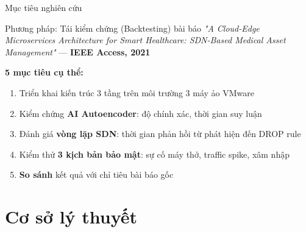\documentclass[aspectratio=169, 12pt]{beamer}
\begin{document}
\begin{frame}{Mục tiêu nghiên cứu}

\begin{block}{Phương pháp: Tái kiểm chứng (Backtesting) bài báo}
\textit{"A Cloud-Edge Microservices Architecture for Smart Healthcare: SDN-Based Medical Asset Management"} — \textbf{IEEE Access, 2021}
\end{block}

\vspace{0.3cm}
\textbf{5 mục tiêu cụ thể:}
\begin{enumerate}
  \item Triển khai kiến trúc 3 tầng trên môi trường 3 máy ảo VMware
  \item Kiểm chứng \textbf{AI Autoencoder}: độ chính xác, thời gian suy luận
  \item Đánh giá \textbf{vòng lặp SDN}: thời gian phản hồi từ phát hiện đến DROP rule
  \item Kiểm thử \textbf{3 kịch bản bảo mật}: sự cố máy thở, traffic spike, xâm nhập
  \item \textbf{So sánh} kết quả với chỉ tiêu bài báo gốc
\end{enumerate}

\end{frame}

\section{Cơ sở lý thuyết}
\end{document}
